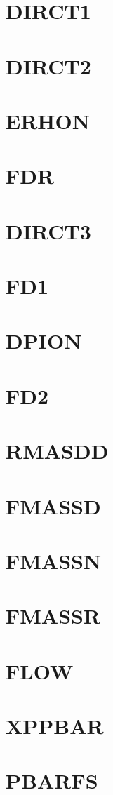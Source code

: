 \documentclass[10pt,UTF8]{ctexbook}
\begin{document}
\section{DIRCT1}
\section{DIRCT2}
\section{ERHON}
\section{FDR}
\section{DIRCT3}
\section{FD1}
\section{DPION}
\section{FD2}
\section{RMASDD}
\section{FMASSD}
\section{FMASSN}
\section{FMASSR}
\section{FLOW}
\section{XPPBAR}
\section{PBARFS}
\end{document}
